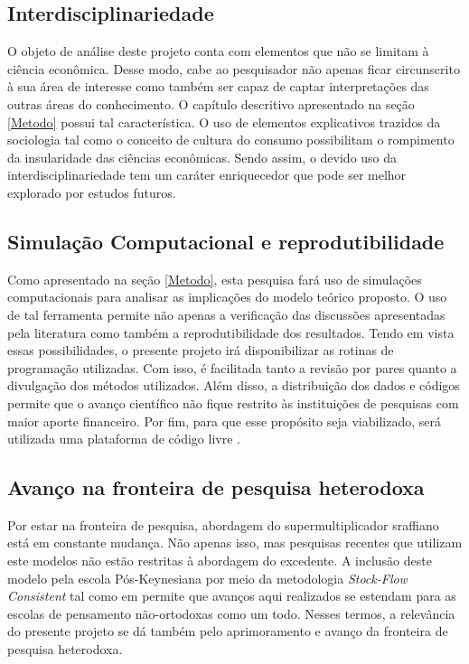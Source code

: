 \subsection{Interdisciplinariedade}
O objeto de análise deste projeto conta com elementos que não se limitam à ciência econômica. Desse modo, cabe ao pesquisador não apenas ficar circunscrito à sua área de interesse como também ser capaz de captar interpretações das outras áreas do conhecimento. O capítulo descritivo apresentado na seção \ref{Metodo} possui tal característica. O uso de elementos explicativos trazidos da sociologia tal como o conceito de cultura do consumo \cites{fontenelle_alcances_2016}{streeck_citizens_2012} possibilitam o rompimento da insularidade das ciências econômicas. Sendo assim, o devido uso da interdisciplinariedade tem um caráter enriquecedor que pode ser melhor explorado por estudos futuros.

\subsection{Simulação Computacional e reprodutibilidade}
Como apresentado na seção \ref{Metodo}, esta pesquisa fará uso de simulações computacionais para analisar as implicações do modelo teórico proposto. O uso de tal ferramenta permite não apenas a verificação das discussões apresentadas pela literatura como também a reprodutibilidade dos resultados. Tendo em vista essas possibilidades, o presente projeto irá disponibilizar as rotinas de programação utilizadas. Com isso, é facilitada tanto a revisão por pares quanto a divulgação dos métodos utilizados. Além disso, a distribuição dos dados e códigos permite que o avanço científico não fique restrito às instituições de pesquisas com maior aporte financeiro. Por fim, para que esse propósito seja viabilizado, será utilizada uma plataforma de código livre \cite{center_for_open_science_osfhome_nodate}.

\subsection{Avanço na fronteira de pesquisa heterodoxa}

Por estar na fronteira de pesquisa, abordagem do supermultiplicador sraffiano está em constante mudança. Não apenas isso, mas pesquisas recentes que utilizam este modelos não estão restritas à abordagem do excedente. A inclusão deste modelo pela escola Pós-Keynesiana por meio da metodologia \textit{Stock-Flow Consistent} tal como em \textcite{brochier_endogenous_2018}
permite que avanços aqui realizados se estendam para as escolas de pensamento não-ortodoxas como um todo. Nesses termos, a relevância do presente projeto se dá também pelo aprimoramento e avanço da fronteira de pesquisa heterodoxa.





